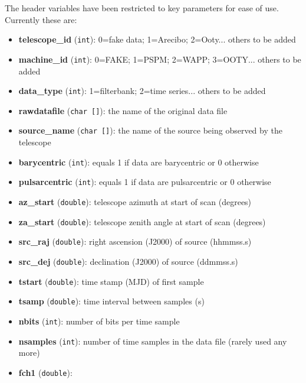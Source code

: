 \documentclass[11pt]{article}
\begin{document}
The header variables have been restricted to key parameters for ease of use.
Currently these are:
\begin{itemize}
\item {\bf telescope\_id} (\verb+int+): 
0=fake data; 1=Arecibo; 2=Ooty... others to be added
\item {\bf machine\_id} (\verb+int+): 
0=FAKE; 1=PSPM; 2=WAPP; 3=OOTY... others to be added
\item {\bf data\_type} (\verb+int+): 
1=filterbank; 2=time series... others to be added
\item {\bf rawdatafile} (\verb+char []+): 
the name of the original data file
\item {\bf source\_name} (\verb+char []+): 
the name of the source being observed by the telescope
\item {\bf barycentric} (\verb+int+):
equals 1 if data are barycentric or 0 otherwise
\item {\bf pulsarcentric} (\verb+int+):
equals 1 if data are pulsarcentric or 0 otherwise
\item {\bf az\_start} (\verb+double+): 
telescope azimuth at start of scan (degrees)
\item {\bf za\_start} (\verb+double+): 
telescope zenith angle at start of scan (degrees)
\item {\bf src\_raj} (\verb+double+): 
right ascension (J2000) of source (hhmmss.s)
\item {\bf src\_dej} (\verb+double+): 
declination (J2000) of source (ddmmss.s)
\item {\bf tstart} (\verb+double+): 
time stamp (MJD) of first sample
\item {\bf tsamp}  (\verb+double+): 
time interval between samples (s)
\item {\bf nbits} (\verb+int+): 
number of bits per time sample
\item {\bf nsamples} (\verb+int+): 
number of time samples in the data file (rarely used any more)
\item {\bf fch1}  (\verb+double+): 

\end{itemize}
\end{document}

